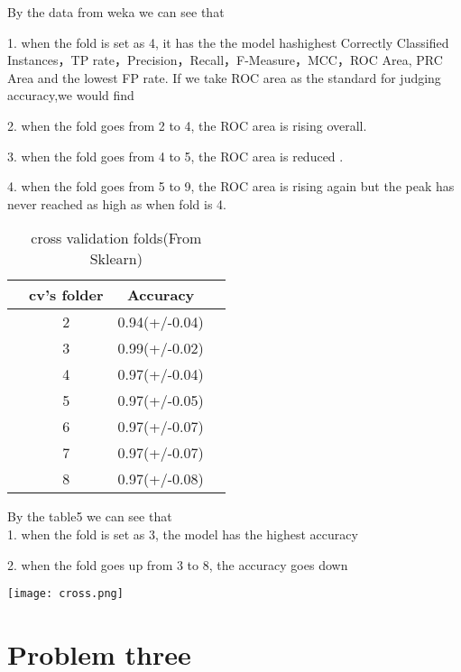 \documentclass[a4pper,11pt,onecolumn]{article}
\begin{document}
By the data from weka we can see that

1. when the fold is set as 4, it has the the model hashighest Correctly Classified Instances，TP rate，Precision，Recall，F-Measure，MCC，ROC Area, PRC Area and the lowest FP rate.
If we take ROC area as the standard for judging accuracy,we would find

2. when the fold goes from 2 to 4, the ROC area is rising overall.

3. when the fold goes from 4 to 5, the ROC area is reduced .

4. when the fold goes from 5 to 9, the ROC area is rising again but the peak has never reached as high as when fold is 4.


\begin{table}[h]  
	\centering  
	\caption{cross validation folds(From Sklearn)}  
	\begin{tabular}{cccc} 
		\hline
		\hline
		& cv's folder & Accuracy  \\ [0.5ex] 
		\hline
		& 2 & 0.94(+/-0.04)   \\
		& 3 & 0.99(+/-0.02)  \\
		& 4 & 0.97(+/-0.04)  \\
		& 5 & 0.97(+/-0.05)  \\
		& 6 & 0.97(+/-0.07) \\
		& 7 & 0.97(+/-0.07) \\
		& 8 & 0.97(+/-0.08) \\

		\hline
		\hline
	\end{tabular}
\end{table}



By the table5 we can see that\\

1. when the fold is  set as 3, the model has the highest accuracy

2. when the fold goes up from 3 to 8, the accuracy goes down

\texttt{[image: cross.png]}

\section{Problem three}
\end{document}
